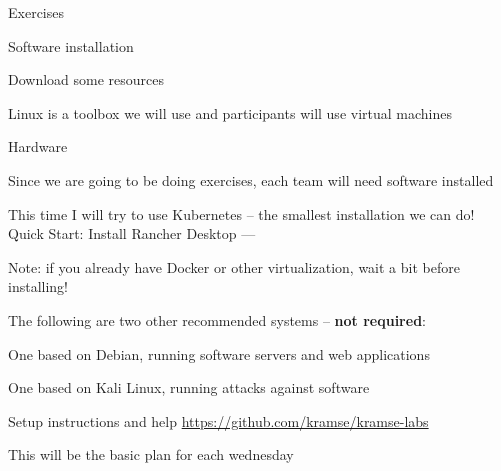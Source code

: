 \documentclass[Screen16to9,17pt]{foils}
\begin{document}
Exercises
\begin{list2}
\item Software installation
\item Download some resources
\end{list2}
Linux is a toolbox we will use and participants will use virtual machines



Hardware

Since we are going to be doing exercises, each team will need software installed

This time I will try to use Kubernetes -- the smallest installation we can do!\\
Quick Start: Install Rancher Desktop — 

Note: if you already have Docker or other virtualization, wait a bit before installing!

The following are two other recommended systems -- {\bf not required}:
\begin{list2}
\item One based on Debian, running software servers and web applications
\item One based on Kali Linux, running attacks against software
\item Setup instructions and help \url{https://github.com/kramse/kramse-labs}
\end{list2}



\vskip 1cm
\centerline{\Large This will be the basic plan for each wednesday}

\end{document}

